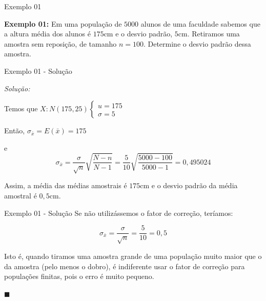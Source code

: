 \documentclass[hyperref={pdfpagelabels=false}]{beamer}
\begin{document}
\begin{frame}{Exemplo 01}
	
	{\bf Exemplo 01:} Em uma população de $5000$ alunos de uma faculdade sabemos que a altura média dos alunos é $175$cm e o desvio padrão, $5$cm. Retiramos uma amostra sem reposição, de tamanho $n=100$. Determine o desvio padrão dessa amostra.
	
	
\end{frame}


\begin{frame}{Exemplo 01 - Solução}
	
	{\it Solução:}
	
	Temos que $X:N(175,25) \begin{cases}
	u = 175 \\
	\sigma = 5
	\end{cases}
	$
	
	\pause
	Então, $\sigma_{\bar{x}} = E(\bar{x}) = 175$
	
	\pause
	e
	$$\sigma_{\bar{x}} = \displaystyle \frac{\sigma}{\sqrt{n}}\sqrt{\frac{N - n}{N - 1}} = \displaystyle \frac{5}{10}\sqrt{\frac{5000 - 100}{5000 - 1}} = 0,495024$$
	
	\pause
	Assim, a média das médias amostrais é $175$cm e o desvio padrão da média amostral é $0,5$cm.
	
	
\end{frame}

\begin{frame}{Exemplo 01 - Solução}
	Se não utilizássemos o fator de correção, teríamos:
	\pause
	
	$$\sigma_{\bar{x}} = \displaystyle \frac{\sigma}{\sqrt{n}} = \frac{5}{10} = 0,5$$
	
	\pause
	Isto é, quando tiramos uma amostra grande de uma população muito maior que o da amostra (pelo menos o dobro), é indiferente usar o fator de correção para populações finitas, pois o erro é muito pequeno.
	
	\begin{flushright}
		$\blacksquare$
	\end{flushright}
\end{frame}
\end{document}
